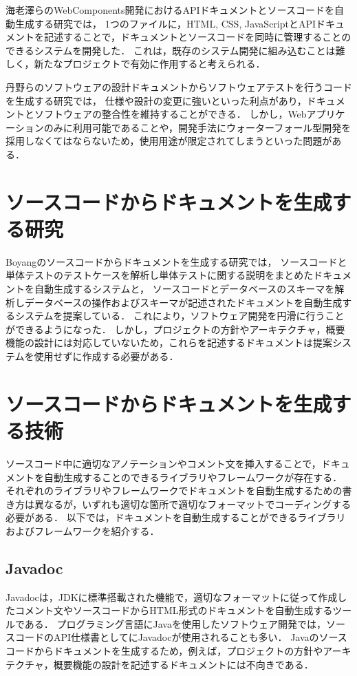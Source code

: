 海老澤らのWebComponents開発におけるAPIドキュメントとソースコードを自動生成する研究\cite{webcomponents}では，
1つのファイルに，HTML, CSS, JavaScriptとAPIドキュメントを記述することで，ドキュメントとソースコードを同時に管理することのできるシステムを開発した．
これは，既存のシステム開発に組み込むことは難しく，新たなプロジェクトで有効に作用すると考えられる．

丹野らのソフトウェアの設計ドキュメントからソフトウェアテストを行うコードを生成する研究\cite{test}では，
仕様や設計の変更に強いといった利点があり，ドキュメントとソフトウェアの整合性を維持することができる．
しかし，Webアプリケーションのみに利用可能であることや，開発手法にウォーターフォール型開発を採用しなくてはならないため，使用用途が限定されてしまうといった問題がある．

\section{ソースコードからドキュメントを生成する研究}
Boyangのソースコードからドキュメントを生成する研究\cite{automatically}では，
ソースコードと単体テストのテストケースを解析し単体テストに関する説明をまとめたドキュメントを自動生成するシステムと，
ソースコードとデータベースのスキーマを解析しデータベースの操作およびスキーマが記述されたドキュメントを自動生成するシステムを提案している．
これにより，ソフトウェア開発を円滑に行うことができるようになった．
しかし，プロジェクトの方針やアーキテクチャ，概要機能の設計には対応していないため，これらを記述するドキュメントは提案システムを使用せずに作成する必要がある．

\section{ソースコードからドキュメントを生成する技術}
ソースコード中に適切なアノテーションやコメント文を挿入することで，ドキュメントを自動生成することのできるライブラリやフレームワークが存在する．
それぞれのライブラリやフレームワークでドキュメントを自動生成するための書き方は異なるが，いずれも適切な箇所で適切なフォーマットでコーディングする必要がある．
以下では，ドキュメントを自動生成することができるライブラリおよびフレームワークを紹介する．

\subsection{Javadoc}
Javadoc\cite{javadoc}は，JDKに標準搭載された機能で，適切なフォーマットに従って作成したコメント文やソースコードからHTML形式のドキュメントを自動生成するツールである．
プログラミング言語にJavaを使用したソフトウェア開発では，ソースコードのAPI仕様書としてにJavadocが使用されることも多い．
Javaのソースコードからドキュメントを生成するため，例えば，プロジェクトの方針やアーキテクチャ，概要機能の設計を記述するドキュメントには不向きである．


